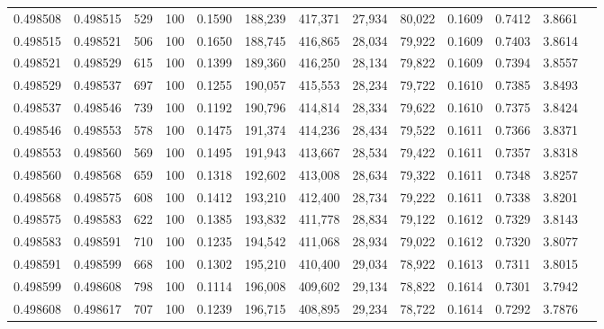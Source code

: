 \begin{tabular}{rrrrrrrrrrrrr}
0.498508 & 0.498515 &   529 & 100 &                                     0.1590 & 188,239 & 417,371 &  27,934 &  80,022 & 0.1609 & 0.7412 & 3.8661 \\
0.498515 & 0.498521 &   506 & 100 &                                     0.1650 & 188,745 & 416,865 &  28,034 &  79,922 & 0.1609 & 0.7403 & 3.8614 \\
0.498521 & 0.498529 &   615 & 100 &                                     0.1399 & 189,360 & 416,250 &  28,134 &  79,822 & 0.1609 & 0.7394 & 3.8557 \\
0.498529 & 0.498537 &   697 & 100 &                                     0.1255 & 190,057 & 415,553 &  28,234 &  79,722 & 0.1610 & 0.7385 & 3.8493 \\
0.498537 & 0.498546 &   739 & 100 &                                     0.1192 & 190,796 & 414,814 &  28,334 &  79,622 & 0.1610 & 0.7375 & 3.8424 \\
0.498546 & 0.498553 &   578 & 100 &                                     0.1475 & 191,374 & 414,236 &  28,434 &  79,522 & 0.1611 & 0.7366 & 3.8371 \\
0.498553 & 0.498560 &   569 & 100 &                                     0.1495 & 191,943 & 413,667 &  28,534 &  79,422 & 0.1611 & 0.7357 & 3.8318 \\
0.498560 & 0.498568 &   659 & 100 &                                     0.1318 & 192,602 & 413,008 &  28,634 &  79,322 & 0.1611 & 0.7348 & 3.8257 \\
0.498568 & 0.498575 &   608 & 100 &                                     0.1412 & 193,210 & 412,400 &  28,734 &  79,222 & 0.1611 & 0.7338 & 3.8201 \\
0.498575 & 0.498583 &   622 & 100 &                                     0.1385 & 193,832 & 411,778 &  28,834 &  79,122 & 0.1612 & 0.7329 & 3.8143 \\
0.498583 & 0.498591 &   710 & 100 &                                     0.1235 & 194,542 & 411,068 &  28,934 &  79,022 & 0.1612 & 0.7320 & 3.8077 \\
0.498591 & 0.498599 &   668 & 100 &                                     0.1302 & 195,210 & 410,400 &  29,034 &  78,922 & 0.1613 & 0.7311 & 3.8015 \\
0.498599 & 0.498608 &   798 & 100 &                                     0.1114 & 196,008 & 409,602 &  29,134 &  78,822 & 0.1614 & 0.7301 & 3.7942 \\
0.498608 & 0.498617 &   707 & 100 &                                     0.1239 & 196,715 & 408,895 &  29,234 &  78,722 & 0.1614 & 0.7292 & 3.7876 \\

\end{tabular}
